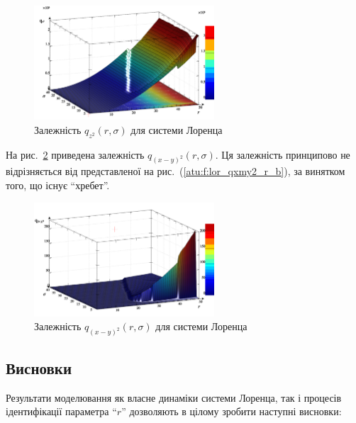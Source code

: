 \begin{figure}[ht!]
  \begin{center}
    \includegraphics[width=0.60\textwidth]{p/cha/lor/q2d/lor_qz2_r_sigma.png}
  \end{center}
  \caption{Залежність $q_{z^2}(r,\sigma)$ для системи Лоренца}
  \label{atu:f:lor_qz2_r_sigma}
\end{figure}

На рис.~\ref{atu:f:lor_qxmy2_r_sigma} приведена залежність
$ q_{(x-y)^2} (r, \sigma) $. Ця залежність принципово не відрізняється
від представленої на рис.~(\ref{atu:f:lor_qxmy2_r_b}), за винятком того, що
існує ``хребет''.

\begin{figure}[ht!]
  \begin{center}
    \includegraphics[width=0.60\textwidth]{p/cha/lor/q2d/lor_qxmy2_r_sigma.png}
  \end{center}
  \caption{Залежність $ q_{(x-y)^2} (r, \sigma) $ для системи Лоренца}
  \label{atu:f:lor_qxmy2_r_sigma}
\end{figure}



\subsection{Висновки}  %

Результати моделювання як власне динаміки системи Лоренца,
так і процесів ідентифікації параметра ``$r$'' дозволяють в
цілому зробити наступні висновки:

